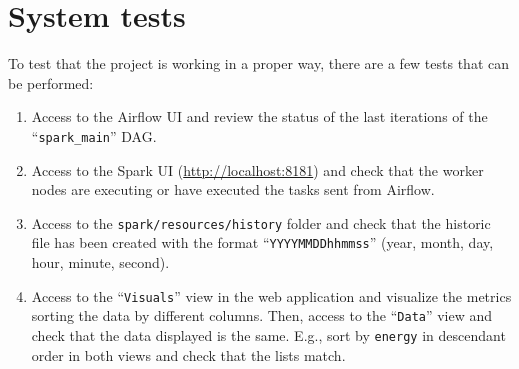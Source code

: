 \section{System tests}
\nonzeroparskip To test that the project is working in a proper way, there are a few tests that can be performed:
\begin{enumerate}
	\item Access to the Airflow UI and review the status of the last iterations of the ``\texttt{spark\_main}'' DAG.
	\item Access to the Spark UI (\url{http://localhost:8181}) and check that the worker nodes are executing or have executed the tasks sent from Airflow.
	\item Access to the \texttt{spark/resources/history} folder and check that the historic file has been created with the format ``\texttt{YYYYMMDDhhmmss}'' (year, month, day, hour, minute, second).
	\item Access to the ``\texttt{Visuals}'' view in the web application and visualize the metrics sorting the data by different columns. Then, access to the ``\texttt{Data}'' view and check that the data displayed is the same. E.g., sort by \texttt{energy} in descendant order in both views and check that the lists match.
\end{enumerate}